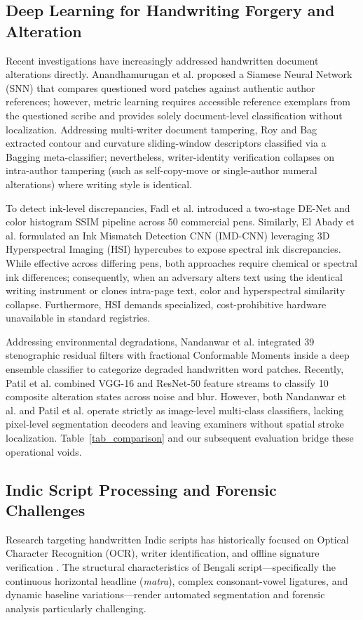 \documentclass[pdflatex,sn-mathphys-num,iicol]{sn-jnl}
\begin{document}
\subsection{Deep Learning for Handwriting Forgery and Alteration}\label{subsec2_3}
Recent investigations have increasingly addressed handwritten document alterations directly. Anandhamurugan et al. \cite{bib19} proposed a Siamese Neural Network (SNN) that compares questioned word patches against authentic author references; however, metric learning requires accessible reference exemplars from the questioned scribe and provides solely document-level classification without localization. Addressing multi-writer document tampering, Roy and Bag \cite{bib25} extracted contour and curvature sliding-window descriptors classified via a Bagging meta-classifier; nevertheless, writer-identity verification collapses on intra-author tampering (such as self-copy-move or single-author numeral alterations) where writing style is identical.

To detect ink-level discrepancies, Fadl et al. \cite{bib20} introduced a two-stage DE-Net and color histogram SSIM pipeline across 50 commercial pens. Similarly, El Abady et al. \cite{bib24} formulated an Ink Mismatch Detection CNN (IMD-CNN) leveraging 3D Hyperspectral Imaging (HSI) hypercubes to expose spectral ink discrepancies. While effective across differing pens, both approaches require chemical or spectral ink differences; consequently, when an adversary alters text using the identical writing instrument or clones intra-page text, color and hyperspectral similarity collapse. Furthermore, HSI demands specialized, cost-prohibitive hardware unavailable in standard registries.

Addressing environmental degradations, Nandanwar et al. \cite{bib21} integrated 39 stenographic residual filters with fractional Conformable Moments inside a deep ensemble classifier to categorize degraded handwritten word patches. Recently, Patil et al. \cite{bib23} combined VGG-16 and ResNet-50 feature streams to classify 10 composite alteration states across noise and blur. However, both Nandanwar et al. and Patil et al. operate strictly as image-level multi-class classifiers, lacking pixel-level segmentation decoders and leaving examiners without spatial stroke localization. Table~\ref{tab_comparison} and our subsequent evaluation bridge these operational voids.

\subsection{Indic Script Processing and Forensic Challenges}\label{subsec2_4}
Research targeting handwritten Indic scripts has historically focused on Optical Character Recognition (OCR), writer identification, and offline signature verification \cite{bib2,bib11,bib12}. The structural characteristics of Bengali script---specifically the continuous horizontal headline (\textit{matra}), complex consonant-vowel ligatures, and dynamic baseline variations---render automated segmentation and forensic analysis particularly challenging.
\end{document}
